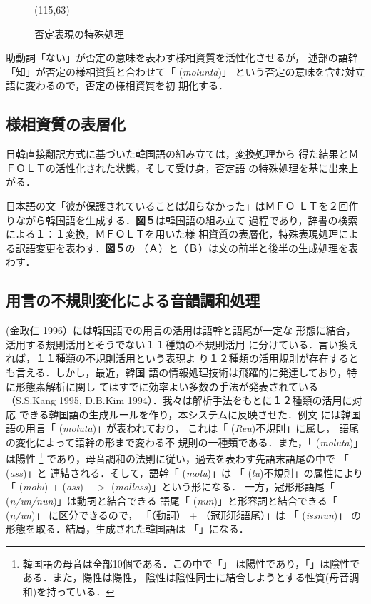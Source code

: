 \begin{figure}[htb]
\atari(115,63)
\caption{否定表現の特殊処理}
\end{figure}

助動詞「ない」が否定の意味を表わす様相資質を活性化させるが，
述部の語幹「知」が否定の様相資質と合わせて「 ({\it molunta})」
という否定の意味を含む対立語に変わるので，否定の様相資質を初
期化する．

\subsection{様相資質の表層化}
日韓直接翻訳方式に基づいた韓国語の組み立ては，変換処理から
得た結果とＭＦＯＬＴの活性化された状態，そして受け身，否定語
の特殊処理を基に出来上がる．

日本語の文「彼が保護されていることは知らなかった」はＭＦＯ
ＬＴを２回作りながら韓国語を生成する．{\bf 図５}は韓国語の組み立て
過程であり，辞書の検索による１：１変換，ＭＦＯＬＴを用いた様
相資質の表層化，特殊表現処理による訳語変更を表わす．{\bf 図５}の
（Ａ）と（Ｂ）は文の前半と後半の生成処理を表わす．

\subsection{用言の不規則変化による音韻調和処理}
(金政仁 1996）には韓国語での用言の活用は語幹と語尾が一定な
形態に結合，活用する規則活用とそうでない１１種類の不規則活用
に分けている．言い換えれば，１１種類の不規則活用という表現よ
り１２種類の活用規則が存在するとも言える．しかし，最近，韓国
語の情報処理技術は飛躍的に発達しており，特に形態素解析に関し
てはすでに効率よい多数の手法が発表されている（S.S.Kang 1995, 
D.B.Kim 1994）．我々は解析手法をもとに１２種類の活用に対応
できる韓国語の生成ルールを作り，本システムに反映させた．例文
には韓国語の用言「 ({\it moluta})」が表われており，
これは「 ({\it Reu})不規則」に属し，
語尾の変化によって語幹の形まで変わる不
規則の一種類である．また，「 ({\it moluta})」は陽性
\footnote{韓国語の母音は全部10個である．この中で「」
は陽性であり，「」は陰性である．また，陽性は陽性，
陰性は陰性同士に結合しようとする性質(母音調和)を持っている．}
であり，母音調和の法則に従い，過去を表わす先語末語尾の中で
「 ({\it ass})」と
連結される．そして，語幹「 ({\it molu})」は
「 ({\it lu})不規則」の属性により
「 ({\it molu}) +  ({\it ass})
 $->$  ({\it mollass})」という形になる．
一方，冠形形語尾「 ({\it n/un/nun})」は動詞と結合できる
語尾「 ({\it nun})」と形容詞と結合できる「 ({\it n/un})」
に区分できるので，
「（動詞） + （冠形形語尾）」は
「 ({\it issnun})」
の形態を取る．結局，生成された韓国語は
「」になる．


